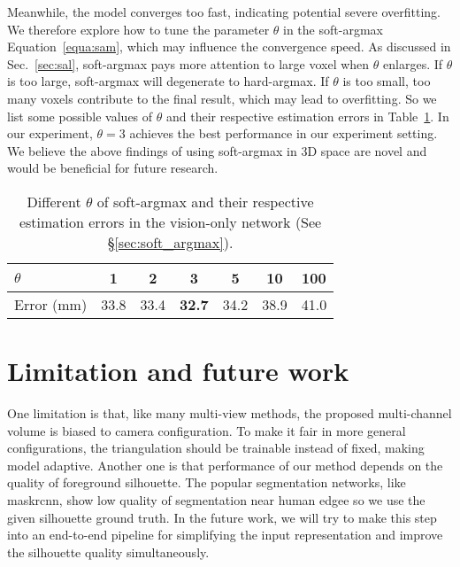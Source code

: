 \documentclass[10pt,twocolumn,letterpaper]{article}
\begin{document}
Meanwhile, the model converges too fast, indicating potential severe overfitting. We therefore explore how to tune the parameter $\theta$ in the soft-argmax Equation~\ref{equa:sam}, which may influence the convergence speed. As discussed in Sec.~\ref{sec:sal}, soft-argmax pays more attention to large voxel when $\theta$ enlarges. If $\theta$ is too large, soft-argmax will degenerate to hard-argmax. If $\theta$ is too small, too many voxels contribute to the final result, which may lead to overfitting. So we list some possible values of $\theta$ and their respective estimation errors in Table~\ref{tab:sfk}. In our experiment, $\theta=3$ achieves the best performance in our experiment setting. We believe the above findings of using soft-argmax in 3D space are novel and would be beneficial for future research. 


\begin{table}[]
\begin{tabular}{|l|c|c|c|c|c|c|}
\hline
$\theta$        & 1    & 2    & 3   & 5    & 10   & 100  \\ \hline
Error (mm) & 33.8 & 33.4 & \textbf{32.7} & 34.2 & 38.9 & 41.0 \\ \hline
\end{tabular}
\caption{Different $\theta$ of soft-argmax and their respective estimation errors in the vision-only network (See \S\ref{sec:soft_argmax}).}
\label{tab:sfk}
\vspace*{-14pt}
\end{table}
\section{Limitation and future work}
\label{sec:limit}


One limitation is that, like many multi-view methods, the proposed multi-channel volume is biased to camera configuration. To make it fair in more general configurations, the triangulation should be trainable instead of fixed, making model adaptive. Another one is that performance of our method depends on the quality of foreground silhouette. The popular segmentation networks, like maskrcnn\cite{he2017mask}, show low quality of segmentation near human edgee so we use the given silhouette ground truth. In the future work, we will try to make this step into an end-to-end pipeline for simplifying the input representation and improve the silhouette quality simultaneously.
\end{document}
